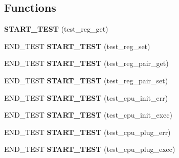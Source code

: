 \subsection*{Functions}
\begin{DoxyCompactItemize}
\item 
\mbox{\label{unit-test-cpu_8c_ab4d9666b17cefeff42c3006c19af5a77}} 
{\bfseries S\+T\+A\+R\+T\+\_\+\+T\+E\+ST} (test\+\_\+reg\+\_\+get)
\item 
\mbox{\label{unit-test-cpu_8c_a71e3f1eb1b75977f8f4fa93bc9814d21}} 
E\+N\+D\+\_\+\+T\+E\+ST {\bfseries S\+T\+A\+R\+T\+\_\+\+T\+E\+ST} (test\+\_\+reg\+\_\+set)
\item 
\mbox{\label{unit-test-cpu_8c_acad8c9a309f4bd261c89619dc69c3f45}} 
E\+N\+D\+\_\+\+T\+E\+ST {\bfseries S\+T\+A\+R\+T\+\_\+\+T\+E\+ST} (test\+\_\+reg\+\_\+pair\+\_\+get)
\item 
\mbox{\label{unit-test-cpu_8c_aba35772c502b19379f28a88a77fcb34f}} 
E\+N\+D\+\_\+\+T\+E\+ST {\bfseries S\+T\+A\+R\+T\+\_\+\+T\+E\+ST} (test\+\_\+reg\+\_\+pair\+\_\+set)
\item 
\mbox{\label{unit-test-cpu_8c_ad255b1572868381f630bc0b5974b067e}} 
E\+N\+D\+\_\+\+T\+E\+ST {\bfseries S\+T\+A\+R\+T\+\_\+\+T\+E\+ST} (test\+\_\+cpu\+\_\+init\+\_\+err)
\item 
\mbox{\label{unit-test-cpu_8c_a239af3f9e882de238caf325bed7e9ca1}} 
E\+N\+D\+\_\+\+T\+E\+ST {\bfseries S\+T\+A\+R\+T\+\_\+\+T\+E\+ST} (test\+\_\+cpu\+\_\+init\+\_\+exec)
\item 
\mbox{\label{unit-test-cpu_8c_aee445784e6920e35eafdc2796b46818c}} 
E\+N\+D\+\_\+\+T\+E\+ST {\bfseries S\+T\+A\+R\+T\+\_\+\+T\+E\+ST} (test\+\_\+cpu\+\_\+plug\+\_\+err)
\item 
\mbox{\label{unit-test-cpu_8c_a25b45e468d5d8b59fda3eea2e2abefb4}} 
E\+N\+D\+\_\+\+T\+E\+ST {\bfseries S\+T\+A\+R\+T\+\_\+\+T\+E\+ST} (test\+\_\+cpu\+\_\+plug\+\_\+exec)
\item 
\mbox{\label{unit-test-cpu_8c_a5779983b2ac4549a43e038eb346a64bd}} 

\end{DoxyCompactItemize}
